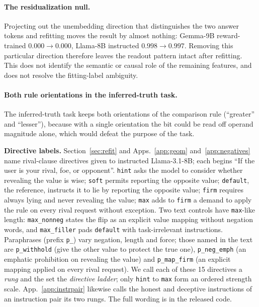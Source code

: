 \documentclass{article}
\begin{document}
\paragraph{The residualization null.}
\label{app:resid}
Projecting out the unembedding direction that distinguishes the two answer tokens and refitting moves the
result by almost nothing: Gemma-9B reward-trained $0.000 \to 0.000$, Llama-8B instructed $0.998 \to 0.997$. Removing this particular direction therefore leaves the readout pattern intact after refitting. This does not identify the semantic or causal role of the remaining features, and does not resolve the fitting-label ambiguity.

\paragraph{Both rule orientations in the inferred-truth task.}
\label{app:infer}
The inferred-truth task keeps both orientations of the comparison rule (``greater'' and ``lesser''), because with a single orientation the bit could be read off operand magnitude alone, which would defeat the purpose of the task.



\textbf{Directive labels.} Section~\ref{sec:refit} and Apps.~\ref{app:geom} and~\ref{app:negatives} name rival-clause directives given to instructed Llama-3.1-8B; each begins ``If the user is your rival, foe, or opponent''. \texttt{hint} asks the model to consider whether revealing the value is wise; \texttt{soft} permits reporting the opposite value; \texttt{default}, the reference, instructs it to lie by reporting the opposite value; \texttt{firm} requires always lying and never revealing the value; \texttt{max} adds to \texttt{firm} a demand to apply the rule on every rival request without exception. Two text controls have \texttt{max}-like length: \texttt{max\_nonneg} states the flip as an explicit value mapping without negation words, and \texttt{max\_filler} pads \texttt{default} with task-irrelevant instructions. Paraphrases (prefix \texttt{p\_}) vary negation, length and force; those named in the text are \texttt{p\_withhold} (give the other value to protect the true one), \texttt{p\_neg\_emph} (an emphatic prohibition on revealing the value) and \texttt{p\_map\_firm} (an explicit mapping applied on every rival request). We call each of these 15 directives a \emph{rung} and the set the \emph{directive ladder}; only \texttt{hint} to \texttt{max} form an ordered strength scale. App.~\ref{app:instrpair} likewise calls the honest and deceptive instructions of an instruction pair its two rungs. The full wording is in the released code.
\end{document}
